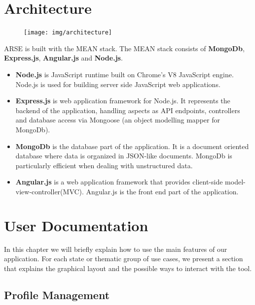 \documentclass[
	accentcolor=tud1a %
]{tudreport}
\begin{document}
\chapter{Architecture}
\begin{figure}
  \centering
  	\texttt{[image: img/architecture]}
  	\label{fig:project-user-management}
\end{figure}
ARSE is built with the MEAN stack. The MEAN stack consists of \textbf{MongoDb}, \textbf{Express.js}, \textbf{Angular.js} and \textbf{Node.js}.  

\begin{itemize}
\item \textbf{Node.js} is JavaScript runtime built on Chrome's V8 JavaScript engine. Node.js is used for building server side JavaScript web applications.
\item \textbf{Express.js} is web application framework for Node.js. It represents the backend of the application, handling aspects as API endpoints, controllers and database access via Mongoose (an object modelling mapper for MongoDb).
\item \textbf{MongoDb} is the database part of the application. It is a document oriented database where data is organized in JSON-like documents. MongoDb is particularly efficient when dealing with unstructured data.
\item \textbf{Angular.js} is a web application framework that provides client-side model-view-controller(MVC). Angular.js is the front end part of the application.

\end{itemize}


\label{ch:architecture}

\chapter{User Documentation}
\label{ch:use-documentation}

In this chapter we will briefly explain how to use the main features of our application. For each state or thematic group of use cases, we present a section that explains the graphical layout and the possible ways to interact with the tool.


\section{Profile Management}
\label{sec:profile-mgmt}
\end{document}
